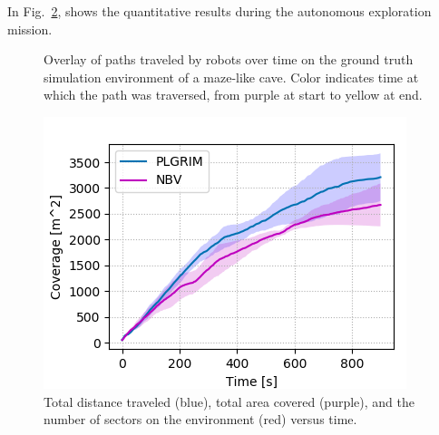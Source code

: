 \documentclass{article}
\begin{document}
In Fig.~\ref{fig:may-demo-plot}, shows the quantitative results during the autonomous exploration mission.

\begin{figure}[t!]
  \centering
  \caption{Overlay of paths traveled by robots over time on the ground truth simulation environment of a maze-like cave.  Color indicates time at which the path was traversed, from purple at start to yellow at end.}
  \label{fig:may-demo-path}
\end{figure}
\begin{figure}[!t]
  \centering
  \includegraphics[width=.75\textwidth]{figures/subway_station_coverage.png}
  \caption{Total distance traveled (blue), total area covered (purple), and the number of sectors on the environment (red) versus  time.}
  \label{fig:may-demo-plot}
\end{figure}
\end{document}
